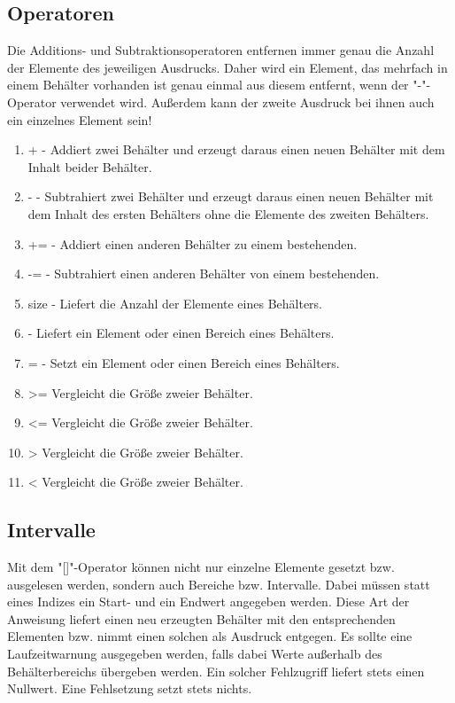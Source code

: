 \subsection{Operatoren}
Die Additions- und Subtraktionsoperatoren entfernen immer genau die Anzahl der Elemente des jeweiligen Ausdrucks.
Daher wird ein Element, das mehrfach in einem Behälter vorhanden ist genau einmal aus diesem entfernt, wenn der "-"-Operator
verwendet wird.
Außerdem kann der zweite Ausdruck bei ihnen auch ein einzelnes Element sein!
\begin{enumerate}
\item + - Addiert zwei Behälter und erzeugt daraus einen neuen Behälter mit dem Inhalt beider Behälter.
\item - - Subtrahiert zwei Behälter und erzeugt daraus einen neuen Behälter mit dem Inhalt des ersten Behälters ohne die Elemente des zweiten Behälters.
\item += - Addiert einen anderen Behälter zu einem bestehenden.
\item -= - Subtrahiert einen anderen Behälter von einem bestehenden.
\item size - Liefert die Anzahl der Elemente eines Behälters.
\item [] - Liefert ein Element oder einen Bereich eines Behälters.
\item []= - Setzt ein Element oder einen Bereich eines Behälters.
\item >= Vergleicht die Größe zweier Behälter.
\item <= Vergleicht die Größe zweier Behälter.
\item > Vergleicht die Größe zweier Behälter.
\item < Vergleicht die Größe zweier Behälter.
\end{enumerate}

\subsection{Intervalle}
Mit dem "[]"-Operator können nicht nur einzelne Elemente gesetzt bzw. ausgelesen werden, sondern auch Bereiche bzw. Intervalle.
Dabei müssen statt eines Indizes ein Start- und ein Endwert angegeben werden. Diese Art der Anweisung liefert einen neu erzeugten
Behälter mit den entsprechenden Elementen bzw. nimmt einen solchen als Ausdruck entgegen.
Es sollte eine Laufzeitwarnung ausgegeben werden, falls dabei Werte außerhalb des Behälterbereichs übergeben werden.
Ein solcher Fehlzugriff liefert stets einen Nullwert.
Eine Fehlsetzung setzt stets nichts.

